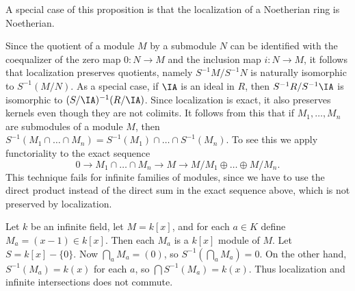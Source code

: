 \begin{remark}
    A special case of this proposition is that the localization of a Noetherian ring is Noetherian.
\end{remark}

Since the quotient of a module $M$ by a submodule $N$ can be identified with the coequalizer of the zero map $0: N \to M$ and the inclusion map $i: N \to M$, it follows that localization preserves quotients, namely $S^{-1}M / S^{-1}N$ is naturally isomorphic to $S^{-1}(M/N)$. As a special case, if $\IA$ is an ideal in $R$, then $S^{-1}R / S^{-1} \IA$ is isomorphic to $(S/\IA)^{-1}(R/\IA)$. Since localization is exact, it also preserves kernels even though they are not colimits. It follows from this that if $M_1, \dots, M_n$ are submodules of a module $M$, then $S^{-1}(M_1 \cap \dots \cap M_n) = S^{-1}(M_1) \cap \dots \cap S^{-1}(M_n)$. To see this we apply functoriality to the exact sequence
%
\[ 0 \to M_1 \cap \dots \cap M_n \to M \to M/M_1 \oplus \dots \oplus M/M_n. \]
%
This technique fails for infinite families of modules, since we have to use the direct product instead of the direct sum in the exact sequence above, which is not preserved by localization.

\begin{example}
    Let $k$ be an infinite field, let $M = k[x]$, and for each $a \in K$ define $M_a = (x - 1) \in k[x]$. Then each $M_a$ is a $k[x]$ module of $M$. Let $S = k[x] - \{ 0 \}$. Now $\bigcap_a M_a = (0)$, so $S^{-1}(\bigcap_a M_a) = 0$. On the other hand, $S^{-1}(M_a) = k(x)$ for each $a$, so $\bigcap S^{-1}(M_a) = k(x)$. Thus localization and infinite intersections does not commute.
\end{example}

